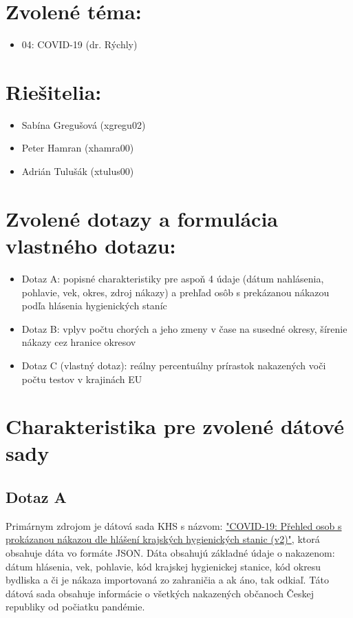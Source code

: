\documentclass[11pt, a4paper]{article}
\begin{document}
\section*{Zvolené téma:} 
\begin{itemize}[noitemsep]
\item 04: COVID-19 (dr. Rýchly)
\end{itemize}

\section*{Riešitelia:}
\begin{itemize}[noitemsep]
\item Sabína Gregušová (xgregu02)
\item Peter Hamran (xhamra00)
\item Adrián Tulušák (xtulus00)
\end{itemize}

\section*{Zvolené dotazy a formulácia vlastného dotazu:}
\begin{itemize}[noitemsep]
\item Dotaz A: popisné charakteristiky pre aspoň 4 údaje (dátum nahlásenia, pohlavie, vek, okres, zdroj nákazy) a prehľad osôb s prekázanou nákazou podľa hlásenia hygienických staníc 
\item Dotaz B: vplyv počtu chorých a jeho zmeny v čase na susedné okresy, šírenie nákazy cez hranice okresov
\item Dotaz C (vlastný dotaz):  reálny percentuálny prírastok nakazených voči počtu testov v krajinách EU
\end{itemize}

\section*{Charakteristika pre zvolené dátové sady}

\subsection*{Dotaz A}
Primárnym zdrojom je dátová sada KHS s názvom: \href{https://onemocneni-aktualne.mzcr.cz/api/v2/covid-19}{"COVID-19: Přehled osob s prokázanou nákazou dle hlášení krajských hygienických stanic (v2)"}, ktorá obsahuje dáta vo formáte JSON. Dáta obsahujú základné údaje o nakazenom: dátum hlásenia, vek, pohlavie, kód krajskej hygienickej stanice, kód okresu bydliska a či je nákaza importovaná zo zahraničia a ak áno, tak odkiaľ. Táto dátová sada obsahuje informácie o všetkých nakazených občanoch Českej republiky od počiatku pandémie.
\end{document}
